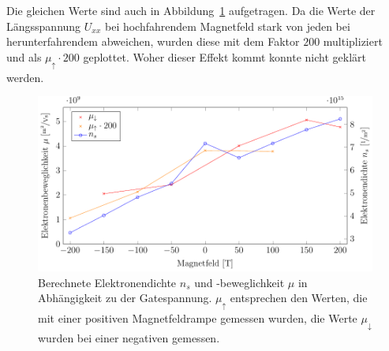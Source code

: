 Die gleichen Werte sind auch in Abbildung~\ref{fig:gate_ausw} aufgetragen. Da die Werte der Längsspannung $U_{xx}$ bei hochfahrendem Magnetfeld stark von jeden bei herunterfahrendem abweichen, wurden diese mit dem Faktor $200$ multipliziert und als $\mu_{\uparrow}\cdot 200$ geplottet. Woher dieser Effekt kommt konnte nicht geklärt werden.

\begin{figure}[h]
	\centering
	\includegraphics[scale=1]{graphs/gate/auswertung.pdf}
	\caption[Auswertung der Gatespannungsvariation]{
		Berechnete Elektronendichte $n_s$ und -beweglichkeit $\mu$ in Abhängigkeit zu der Gatespannung. $\mu_{\uparrow}$ entsprechen den Werten, die mit einer positiven Magnetfeldrampe gemessen wurden, die Werte $\mu_{\downarrow}$ wurden bei einer negativen gemessen.
	}
	\label{fig:gate_ausw}
\end{figure}
